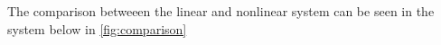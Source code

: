 The comparison betweeen the linear and nonlinear system can be seen
in the system below in \autoref{fig:comparison}
